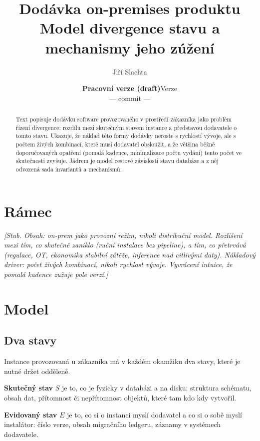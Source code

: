 \documentclass[11pt,a4paper]{article}
\title{Dodávka on-premises produktu\\\large Model divergence stavu a mechanismy jeho zúžení}
\author{Jiří Slachta}
\date{%
  \ifdocdraft\textbf{Pracovní verze (draft)}\else Verze \docversion\fi\\[2pt]
  \small\ifdocdraft\texttt{\docversion} --- \fi
  commit \texttt{\doccommit} --- \docdate}
\newcounter{invariant}
\begin{document}
\maketitle

\begin{abstract}
\noindent
Text popisuje dodávku software provozovaného v prostředí zákazníka jako
problém řízení divergence: rozdílu mezi skutečným stavem instance a
představou dodavatele o tomto stavu. Ukazuje, že náklad této formy dodávky
neroste s rychlostí vývoje, ale s počtem živých kombinací, které musí
dodavatel obsloužit, a že většina běžně doporučovaných opatření
(pomalá kadence, minimalizace počtu vydání) tento počet ve skutečnosti
zvyšuje. Jádrem je model cestové závislosti stavu databáze a z něj
odvozená sada invariantů a mechanismů.
\end{abstract}

\tableofcontents
\bigskip

\section{Rámec}
\label{sec:ramec}

\emph{[Stub. Obsah: on-prem jako provozní režim, nikoli distribuční model.
Rozlišení mezi tím, co skutečně zaniklo (ruční instalace bez pipeline),
a tím, co přetrvává (regulace, OT, ekonomika stabilní zátěže, inference
nad citlivými daty). Nákladový driver: počet živých kombinací, nikoli
rychlost vývoje. Vyvrácení intuice, že pomalá kadence zužuje pole verzí.]}

\section{Model}
\label{sec:model}

\subsection{Dva stavy}

Instance provozovaná u zákazníka má v každém okamžiku dva stavy, které
je nutné držet odděleně.

\textbf{Skutečný stav} $S$ je to, co je fyzicky v databázi a na disku:
struktura schématu, obsah dat, přítomnost či nepřítomnost objektů, které
tam kdo kdy vytvořil.

\textbf{Evidovaný stav} $E$ je to, co si o instanci myslí dodavatel a
co si o sobě myslí instalátor: číslo verze, obsah migračního ledgeru,
záznamy v systémech dodavatele.
\end{document}
